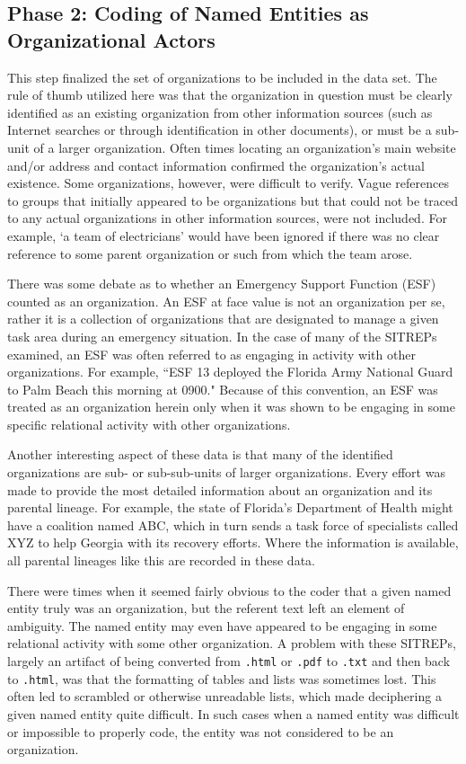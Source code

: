 \documentclass[11pt]{article}
\begin{document}
\subsection{Phase 2: Coding of Named Entities as Organizational Actors}
This step finalized the set of organizations to be included in the data set.  The rule of thumb utilized here was that the organization in question must be clearly identified as an existing organization from other information sources (such as Internet searches or through identification in other documents), or must be a sub-unit of a larger organization.  Often times locating an organization's main website and/or address and contact information confirmed the organization's actual existence.  Some organizations, however, were difficult to verify.  Vague references to groups that initially appeared to be organizations but that could not be traced to any actual organizations in other information sources, were not included.  For example, `a team of electricians' would have been ignored if there was no clear reference to some parent organization or such from which the team arose.

There was some debate as to whether an Emergency Support Function (ESF) counted as an organization.  An ESF at face value is not an organization per se, rather it is a collection of organizations that are designated to manage a given task area during an emergency situation.  In the case of many of the SITREPs examined, an ESF was often referred to as engaging in activity with other organizations.  For example, ``ESF 13 deployed the Florida Army National Guard to Palm Beach this morning at 0900."  Because of this convention, an ESF was treated as an organization herein only when it was shown to be engaging in some specific relational activity with other organizations.

Another interesting aspect of these data is that many of the identified organizations are sub- or sub-sub-units of larger organizations.  Every effort was made to provide the most detailed information about an organization and its parental lineage.  For example, the state of Florida's Department of Health might have a coalition named ABC, which in turn sends a task force of specialists called XYZ to help Georgia with its recovery efforts.  Where the information is available, all parental lineages like this are recorded in these data.

There were times when it seemed fairly obvious to the coder that a given named entity truly was an organization, but the referent text left an element of ambiguity.  The named entity may even have appeared to be engaging in some relational activity with some other organization.  A problem with these SITREPs, largely an artifact of being converted from \texttt{.html} or \texttt{.pdf} to \texttt{.txt} and then back to \texttt{.html}, was that the formatting of tables and lists was sometimes lost.  This often led to scrambled or otherwise unreadable lists, which made deciphering a given named entity quite difficult.  In such cases when a named entity was difficult or impossible to properly code, the entity was not considered to be an organization.
\end{document}
